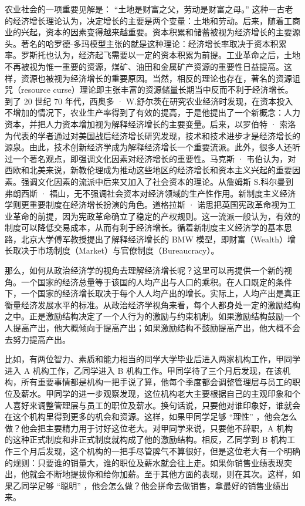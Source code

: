农业社会的一项重要见解是： “土地是财富之父，劳动是财富之母。” 这种一古老的经济增长理论认为，决定增长的主要是两个变量：土地和劳动。后来，随着工商业的兴起，资本的因素变得越来越重要。资本积累和储蓄被视为经济增长的主要源头。著名的哈罗德-多玛模型主张的就是这种理论：经济增长率取决于资本积累率。罗斯托也认为，经济起飞需要以一定的资本积累为前提。工业革命之后，土地不再被视为惟一重要的资源，煤矿、油田和金属矿产资源的重要性日益提高。这样，资源也被视为经济增长的重要原因。当然，相反的理论也存在，著名的资源诅咒（resource curse）理论即主张丰富的资源储量长期当中反而不利于经济增长。到了 20 世纪 70 年代，西奥多 · W.舒尔茨在研究农业经济时发现，在资本投入不增加的情况下，农业生产率得到了有效的提高，于是他提出了一个新概念：人力资本，并把人力资本增加视为解释经济增长的主要变量。后来，以罗伯特 · 索洛为代表的学者通过对美国战后经济增长研究发现，技术和技术进步才是经济增长的源泉。由此，技术创新经济学成为解释经济增长一个重要流派。此外，很多人还听过一个著名观点，即强调文化因素对经济增长的重要性。马克斯 · 韦伯认为，对西欧和北美来说，新教伦理成为推动这些地区的经济增长和资本主义兴起的重要因素。强调文化因素的流派中后来又加入了社会资本的理论。从詹姆斯 S.科尔曼到弗朗西斯 · 福山，无不强调社会资本对经济领域的生产性作用。新制度主义经济学则更重要制度在经济增长扮演的角色。道格拉斯 · 诺思把英国宪政革命视为工业革命的前提，因为宪政革命确立了稳定的产权规则。这一流派一般认为，有效的制度可以降低交易成本，从而有利于经济增长。循着新制度主义经济学的基本思路，北京大学傅军教授提出了解释经济增长的 BMW 模型，即财富（Wealth）增长取决于市场制度（Market）与官僚制度（Bureaucracy）。

那么，如何从政治经济学的视角去理解经济增长呢？这里可以再提供一个新的视角。一个国家的经济总量等于该国的人均产出与人口的乘积。在人口既定的条件下，一个国家的经济增长取决于每个人人均产出的增长。实际上，人均产出是真正衡量经济发展水平的标准。从政治经济学视角来看，每个人都身处一定的激励结构之中。正是激励结构决定了一个人行为的激励与约束机制。如果激励结构鼓励一个人提高产出，他大概倾向于提高产出；如果激励结构不鼓励提高产出，他大概不会去努力提高产出。

比如，有两位智力、素质和能力相当的同学大学毕业后进入两家机构工作，甲同学进入 A 机构工作，乙同学进入 B 机构工作。甲同学待了三个月后发现，在该机构，所有重要事情都是机构一把手说了算，他每个季度都会调整管理层与员工的职位及薪水。甲同学的进一步观察发现，这位机构老大主要根据自己的主观印象和个人喜好来调整管理层与员工的职位及薪水。换句话说，只要他对谁印象好，谁就会在这个机构里得到更多的机会和资源。这样，如果甲同学足够 “理性” ，他会怎么做？他会把主要精力用于讨好这位老大。对甲同学来说，只要他不辞职，A 机构的这种正式制度和非正式制度就构成了他的激励结构。相反，乙同学到 B 机构工作三个月后发现，这个机构的一把手尽管脾气不算很好，但是这位老大有一个明确的规则：只要谁的销量大，谁的职位及薪水就会往上走。如果你销售业绩表现突出，他就会不断地提拔你和给你加薪。至于其他方面的表现，则在其次。这样，如果乙同学足够 “聪明” ，他会怎么做？他会拼命去做销售，拿最好的销售业绩出来。


